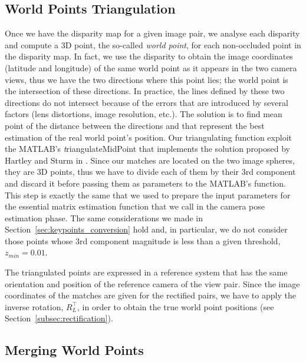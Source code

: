 \subsection{World Points Triangulation}\label{subsec:triangulation}
Once we have the disparity map for a given image pair, we analyse each
disparity and compute a 3D point, the so-called \emph{world point}, for each
non-occluded point in the disparity map.
In fact, we use the disparity to obtain the image coordinates (latitude and
longitude) of the same world point as it appears in the two camera views,
thus we have the two directions where this point lies; the world point is
the intersection of these directions.
In practice, the lines defined by these two directions do not intersect
because of the errors that are introduced by several factors (lens
distortions, image resolution, etc.). The solution is to find mean point of the
distance between the directions and that represent the best estimation
of the real world point's position.
Our triangulating function exploit the MATLAB's {\textit triangulateMidPoint}
that implements the solution proposed by Hartley and Sturm in
\cite{hartley1997triangulation}. Since our matches are located on the two
image spheres, they are 3D points, thus we have to divide each of them by their
3rd component and discard it before passing them as parameters to the
MATLAB's function. This step is exactly the same that we used to prepare
the input parameters for the essential matrix estimation function that we
call in the camera pose estimation phase. The same considerations we made in
Section~\ref{sec:keypoints_conversion}
hold and, in particular, we do not consider those points whose
3rd component magnitude is less than a given threshold, $z_{min} = 0.01$.

The triangulated points are expressed in a reference system that has the same
orientation and position of the reference camera of the view pair.
Since the image coordinates of the matches are given for the rectified pairs,
we have to apply the inverse rotation, $R_L^\top$, in order to obtain the true
world point positions (see Section~\ref{subsec:rectification}).

\subsection{Merging World Points}\label{subsec:merging_worldPoints}

